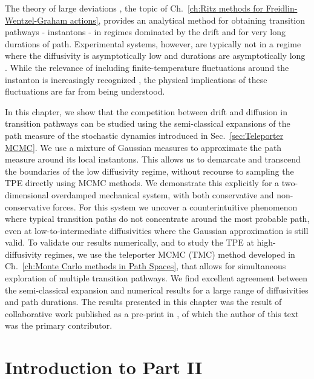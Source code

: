 \documentclass[]{cam-thesis}
\begin{document}
The theory of large deviations \citep{wentzellSmallRandomPerturbations1970, stratonovichMarkovMethodsTheory1989a, grahamMacroscopicPotentialsBifurcations1989a, arnoldStochasticDifferentialEquations1974a}, the topic of Ch.~\ref{ch:Ritz methods for Freidlin-Wentzel-Graham actions},
provides an analytical method for obtaining transition pathways -
instantons - in regimes dominated by the drift and for very long durations
of path. Experimental systems, however, are typically not in a regime
where the diffusivity is asymptotically low and durations are asymptotically
long \citep{gladrowExperimentalMeasurementRelative2021a}. While the
relevance of including finite-temperature fluctuations around the
instanton \citep{gelfandIntegrationFunctionalSpaces1960a} is increasingly
recognized \citep{nickelsenNoiseCorrectionLarge2022, corazzaNormalizedGaussianPath2020b, luGaussianApproximationsTransition2017a},
the physical implications of these fluctuations are far from being
understood.

In this chapter, we show that the competition between drift and diffusion
in transition pathways can be studied using the semi-classical expansions
of the path measure of the stochastic dynamics introduced in Sec.~\ref{sec:Teleporter MCMC}. We use a mixture of
Gaussian measures to approximate the path measure around its local
instantons. This allows us to demarcate and transcend the boundaries
of the low diffusivity regime, without recourse to sampling the TPE directly using MCMC methods. We demonstrate this explicitly for
a two-dimensional overdamped mechanical system, with both conservative
and non-conservative forces. For this system we uncover a counterintuitive
phenomenon where typical transition paths do not concentrate around
the most probable path, even at low-to-intermediate diffusivities
where the Gaussian approximation is still valid. To validate our results
numerically, and to study the TPE at high-diffusivity regimes, we use the teleporter MCMC (TMC) method developed in Ch.~\ref{ch:Monte Carlo methods in Path Spaces},
that allows for simultaneous exploration of multiple transition pathways. We
find excellent agreement between the semi-classical expansion and
numerical results for a large range of diffusivities and path durations. The results presented in this chapter was the result of collaborative work published as a pre-print in \citep{kikuchiDiffusivityDependenceTransition2022}, of which the author of this text was the primary contributor.




\section*{Introduction to Part II}
\end{document}
